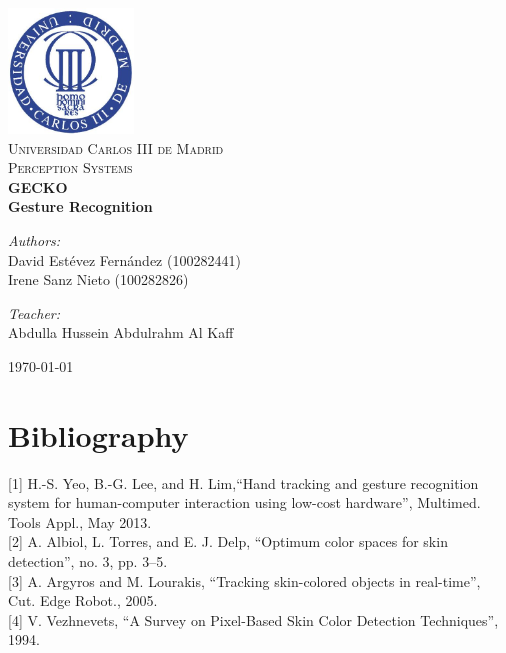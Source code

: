 \documentclass[11pt]{article}
\begin{document}
\begin{center}
\includegraphics[width=0.25\textwidth]{images/uc3m.jpg}\\[2cm]
\textsc{\LARGE Universidad Carlos III de Madrid}\\[0.5cm]
\textsc{\Large Perception Systems}\\[4cm]


{\huge \bfseries{GECKO\\Gesture Recognition}\\[8cm]}


\begin{minipage}{0.55\textwidth}
\begin{flushleft} \large
\emph{Authors:}\\
David Estévez Fernández (100282441)\\
Irene Sanz Nieto (100282826)\\
\end{flushleft}
\end{minipage}
\begin{minipage}{0.4\textwidth}
\begin{flushright} \large
\emph{Teacher:}\\
Abdulla Hussein Abdulrahm Al Kaff
\end{flushright}\end{minipage}\vfill

{\large \today}

\end{center}
%
\newpage
%
\tableofcontents
\newpage

\lhead{}
\chead{}
\pagestyle{fancy}






\section{Bibliography}

[1] H.-S. Yeo, B.-G. Lee, and H. Lim,``Hand tracking and gesture recognition system for human-computer interaction using low-cost hardware'', Multimed. Tools Appl., May 2013.
\\[1cm]
[2] A. Albiol, L. Torres, and E. J. Delp, ``Optimum color spaces for skin detection'', no. 3, pp. 3–5.
\\[1cm]
[3] A. Argyros and M. Lourakis, ``Tracking skin-colored objects in real-time'', Cut. Edge Robot., 2005.
\\[1cm]
[4] V. Vezhnevets, ``A Survey on Pixel-Based Skin Color Detection Techniques'', 1994.
\end{document}
